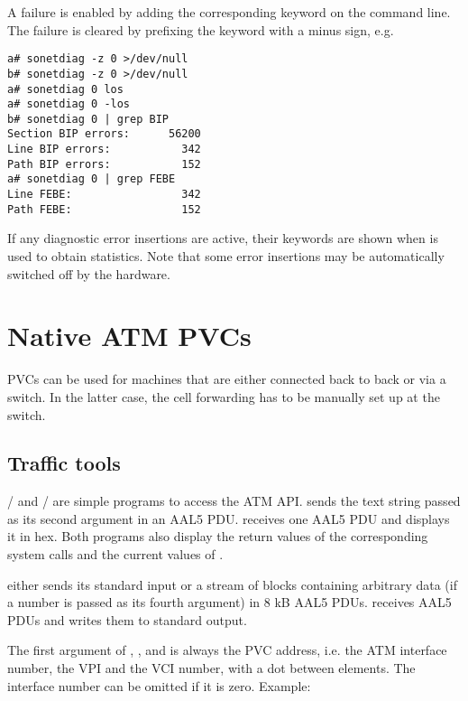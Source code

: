 A failure is enabled by adding the corresponding keyword on the
command line. The failure is cleared by prefixing the keyword with
a minus sign, e.g.

\begin{verbatim}
a# sonetdiag -z 0 >/dev/null
b# sonetdiag -z 0 >/dev/null
a# sonetdiag 0 los
a# sonetdiag 0 -los
b# sonetdiag 0 | grep BIP
Section BIP errors:      56200
Line BIP errors:           342
Path BIP errors:           152
a# sonetdiag 0 | grep FEBE
Line FEBE:                 342
Path FEBE:                 152
\end{verbatim}

If any diagnostic error insertions are active, their keywords are
shown when  is used to obtain statistics. Note that some
error insertions may be automatically switched off by the hardware.




\section{Native ATM PVCs}

PVCs can be used for machines that are either connected back to back or
via a switch. In the latter case, the cell forwarding has to be manually
set up at the switch.


\subsection{Traffic tools}

/ and / are simple programs to
access the ATM API.  sends the text string passed as its
second argument in an AAL5 PDU.  receives one AAL5 PDU and
displays it in hex. Both programs also display the return values of the
corresponding system calls and the current values of .

 either sends its standard input or a stream of blocks containing
arbitrary data (if a number is passed as its fourth argument) in 8 kB
AAL5 PDUs.  receives AAL5 PDUs and writes them to standard output.

The first argument of , ,  and 
is always the PVC address,
i.e. the ATM interface number, the VPI and the VCI number, with a dot
between elements. The interface number can be omitted if it is zero.
Example:

